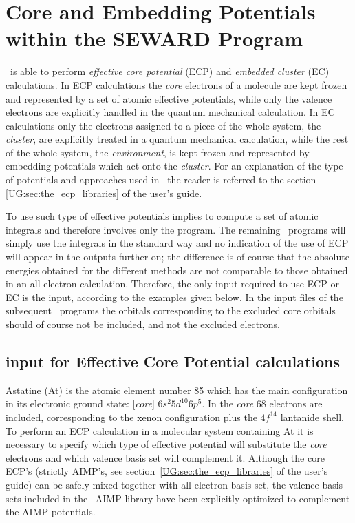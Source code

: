 \section{Core and Embedding Potentials within the SEWARD Program}
\label{TUT:sec:ecp}

\molcasversion\ is able to perform {\em effective core potential} (ECP)
and {\em embedded cluster} (EC) calculations. 
In ECP calculations \cite{Wahlgren:92,Seijo:99}
the {\em core} electrons of a molecule are kept frozen and represented by a set of atomic
effective potentials, while only the valence electrons are explicitly handled 
in the quantum mechanical calculation. In EC calculations only the electrons
assigned to a piece of the whole system, the {\em cluster}, are explicitly
treated in a quantum mechanical calculation, while the rest of the whole
system, the {\em environment}, is kept frozen and represented by embedding
potentials which act onto the {\em cluster}. For an explanation of the
type of potentials and approaches used in \molcas\ the reader is referred
to the section \ref{UG:sec:the_ecp_libraries} of the user's guide.

To use such type of effective potentials implies to compute a set
of atomic integrals and therefore involves only the  program.
The remaining \molcas\ programs will simply use the integrals in the
standard way and no indication of the use of ECP will appear in the 
outputs further on; the difference is of course that the absolute energies
obtained for the different methods are not comparable to those obtained
in an all-electron calculation. Therefore, the only input required to
use ECP or EC is the  input, according to the examples
given below. In the input files of the subsequent \molcas\ programs the
orbitals corresponding to the excluded core orbitals should of course not be
included, and not the excluded electrons.

\subsection{ input for Effective Core Potential calculations}

Astatine (At) is the atomic element number 85 which has the main configuration 
in its electronic ground state: [{\em core}] $6s^2 5d^{10} 6p^5$. In the 
{\em core} 68 electrons are included, corresponding to the xenon configuration
plus the $4f^{14}$ lantanide shell. To perform an ECP calculation in a 
molecular system containing At it is necessary to specify which type of 
effective potential will substitute the {\em core} electrons and which valence 
basis set will complement it. Although the core ECP's (strictly AIMP's, see 
section~\ref{UG:sec:the_ecp_libraries} of the user's guide) can be safely 
mixed together with all-electron basis set, the valence basis sets included
in the \molcas\ AIMP library have been explicitly optimized to complement the
AIMP potentials. 

